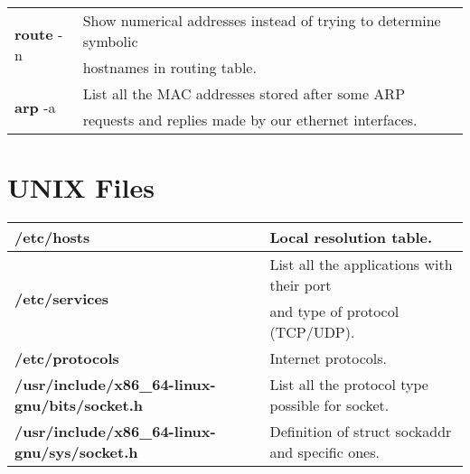 \begin{table}[h]
\begin{tabular}{|l|l|l|}
\hline
\multicolumn{2}{|l|}{\multirow{2}{*}{\textbf{route} -n}} & {Show numerical addresses instead of trying to determine symbolic}\\
\multicolumn{2}{|l|}{} & {hostnames in routing table.}\\
\multicolumn{2}{|l|}{\multirow{2}{*}{\textbf{arp} -a}} & {List all the MAC addresses stored after some ARP}\\
\multicolumn{2}{|l|}{} & {requests and replies made by our ethernet interfaces.}\\
\hline
\end{tabular}
\end{table}


\section{UNIX Files}\label{files}
\begin{table}[h]
\centering
\footnotesize
\begin{tabular}{|l|l|}
\hline
\textbf{/etc/hosts} & {Local resolution table.}\\
\hline
\multirow{2}{*}{\textbf{/etc/services}} & {List all the applications with their port}\\
& {and type of protocol (TCP/UDP).}\\
\hline
{\textbf{/etc/protocols}} & {Internet protocols.}\\
\hline
{\textbf{/usr/include/x86\_64-linux-gnu/bits/socket.h}} & {List all the protocol type possible for socket.}\\
\hline
{\textbf{/usr/include/x86\_64-linux-gnu/sys/socket.h}} & {Definition of struct sockaddr and specific ones.}\\
\hline
\end{tabular}
\end{table}

